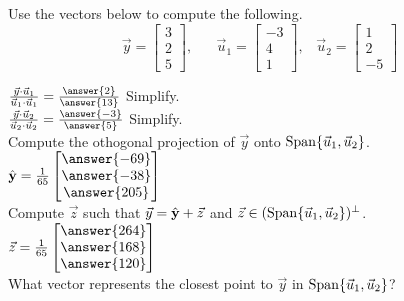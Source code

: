 \documentclass{ximera}
\newcommand{\Span}{\mathop{\rm Span}}
\begin{document}
  	  		             \begin{question} 
  	  		             	Use the vectors below to compute the following. 
  	  		             	$$\vec{y} = \begin{bmatrix} 3\\2\\5\end{bmatrix}, \hspace{20pt} \vec{u}_1 = \begin{bmatrix} -3\\4\\1\end{bmatrix}, \hspace{10pt} \vec{u}_2 = \begin{bmatrix} 1\\2\\-5\end{bmatrix}$$
  	  		             	
  	  		             $\frac{\vec{y}\cdot\vec{u}_1}{\vec{u}_1\cdot\vec{u}_1} =\frac{\answer{2}}{\answer{13}}$ Simplify.\vspace{10pt}\\
  	  		              $\frac{\vec{y}\cdot\vec{u}_2}{\vec{u}_2\cdot\vec{u}_2} =\frac{\answer{-3}}{\answer{5}} $ Simplify. \vspace{10pt}\\
  	  		              Compute the othogonal projection of $\vec{y}$ onto $\Span\{\vec{u}_1,\vec{u}_2\}$.\vspace{10pt}\\
  	  		             $	\hat{\bf y} = \frac{1}{65}\begin{bmatrix} \answer{-69}\\\answer{-38}\\\answer{205}\end{bmatrix}$\vspace{10pt}\\
  	  		             Compute $\vec{z}$ such that $\vec{y} = 	\hat{\bf y} +\vec{z}$ and $\vec{z}\in (\Span\{\vec{u}_1,\vec{u}_2\} )^\perp$.\vspace{10pt}\\
  	  		           $\vec{z} = \frac{1}{65}\begin{bmatrix} \answer{264}\\\answer{168}\\\answer{120}\end{bmatrix}$\vspace{10pt}\\
  	  		           
  	  		           What vector represents the closest point to $\vec{y}$ in $\Span\{\vec{u}_1,\vec{u}_2\}$?\\
  	  		           
  	  		           	\begin{multipleChoice}
  	  		           	\end{multipleChoice}
  	  		             \end{question}
  
\end{document}
